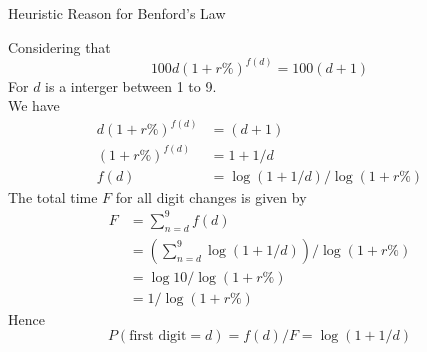 \documentclass[12pt]{article}
\newenvironment{question}[2][Question]{\begin{trivlist}
    \item[\hskip \labelsep {\bfseries #1}\hskip \labelsep {\bfseries #2.}]}{\end{trivlist}}
\newenvironment{answer}[2][Answer]{\begin{trivlist}
    \item[\hskip \labelsep {\bfseries #1}\hskip \labelsep {\bfseries #2.}]}{\end{trivlist}}
\begin{document}
\begin{question}{Q. 2}
	Heuristic Reason for Benford’s Law
\end{question}
\begin{answer}{Q. 2}
	\hfill \break
	Considering that
	\begin{equation}
		100d(1+r\%)^{f(d)}=100(d+1)
	\end{equation}
	For $d$ is a interger between 1 to 9. \\
	We have
	\begin{align}
		d(1+r\%)^{f(d)} & =(d+1)                       \\
		(1+r\%)^{f(d)}  & =1+1/d                       \\
		f(d)            & = \log (1+1/d) / \log(1+r\%)
	\end{align}
	The total time $F$ for all digit changes is given by
	\begin{align}
		F & = \sum_{n=d}^9 f(d)                                    \\
		  & = \left(\sum_{n=d}^9 \log (1+1/d)\right) / \log(1+r\%) \\
		  & = \log 10 / \log (1+r\%)                               \\
		  & = 1 / \log (1+r\%)
	\end{align}
	Hence
	\begin{equation}
		P(\textrm{first digit} = d) = f(d)/F = \log (1+1/d)
	\end{equation}
\end{answer}
\end{document}
